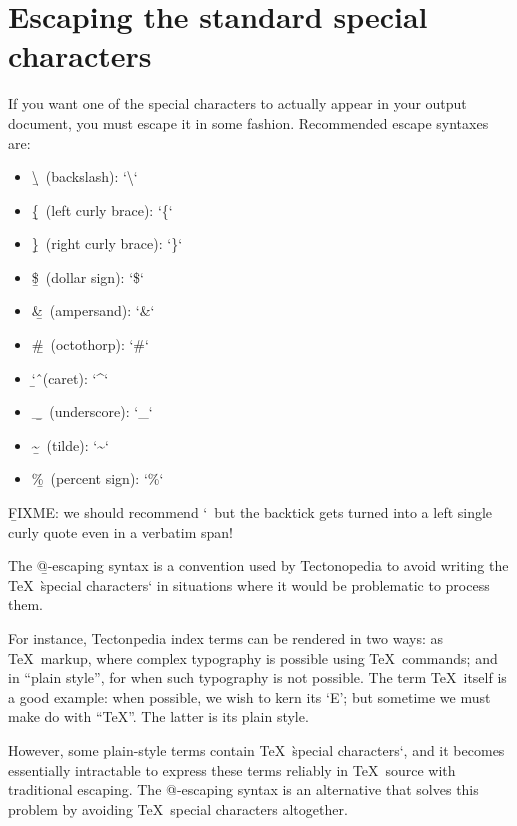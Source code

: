 \section*{Escaping the standard special characters}

If you want one of the special characters to actually appear in your output
document, you must escape it in some fashion. Recommended escape syntaxes are:
\begin{itemize}
    \item \b{\textbackslash\ (backslash)}: \tex`\textbackslash`
    \item \b{\{\ (left curly brace)}: \tex`\{`
    \item \b{\}\ (right curly brace)}: \tex`\}`
    \item \b{\$\ (dollar sign)}: \tex`\$`
    \item \b{\&\ (ampersand)}: \tex`\&`
    \item \b{\#\ (octothorp)}: \tex`\#`
    \item \b{\char`\^\ (caret)}: \tex`\textasciicircum`
    \item \b{\_\ (underscore)}: \tex`\_`
    \item \b{\textasciitilde\ (tilde)}: \tex`\textasciitilde`
    \item \b{\%\ (percent sign)}: \tex`\%`
\end{itemize}
\b{FIXME: we should recommend \string\char`\string\X\ but the backtick gets
turned into a left single curly quote even in a verbatim span!}



The \b{@-escaping} syntax is a convention used by Tectonopedia to avoid writing
the \TeX\ \`special characters` in situations where it would be problematic to
process them.

For instance, Tectonpedia index terms can be rendered in two ways: as \TeX\
markup, where complex typography is possible using \TeX\ commands; and in “plain
style”, for when such typography is not possible. The term \TeX\ itself is a
good example: when possible, we wish to kern its ‘E’; but sometime we must make
do with “TeX”. The latter is its plain style.

However, some plain-style terms contain \TeX\ \`special characters`, and it
becomes essentially intractable to express these terms reliably in \TeX\ source
with traditional escaping. The @-escaping syntax is an alternative that solves
this problem by avoiding \TeX\ special characters altogether.

